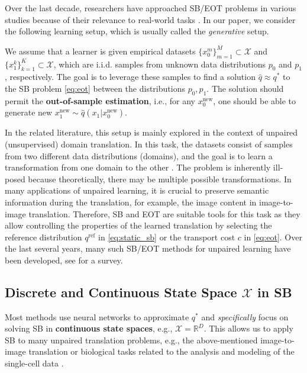 Over the last decade, researchers have approached SB/EOT problems in various studies because of their relevance to real-world tasks \cite{peyre2019computational,gushchin2023building}. In our paper, we consider the following learning setup, which is usually called the \textit{generative} setup.

We assume that a learner is given empirical datasets $\{x^m_0\}_{m=1}^M \subset \mathcal{X}$ and $\{x^k_1\}_{k=1}^K \subset \mathcal{X}$, which are i.i.d. samples from unknown data distributions $p_0$ and $p_1$, respectively. The goal is to leverage these samples to find a solution $\widehat{q}\approx q^{*}$ to the SB problem \eqref{eq:eot} between the distributions $p_0, p_1$. The solution should permit the \textbf{out-of-sample estimation}, i.e., for any $x_{0}^{\text{new}}$, one should be able to generate new $x_{1}^{\text{new}}\sim \widehat{q}(x_1|x_{0}^{\text{new}})$.

In the related literature, this setup is mainly explored in the context of unpaired (unsupervised) domain translation. In this task, the datasets consist of samples from two different data distributions (domains), and the goal is to learn a transformation from one domain to the other \citep[Figure 2]{zhu2017unpaired}. The problem is inherently ill-posed because theoretically, there may be multiple possible transformations. In many applications of unpaired learning, it is crucial to preserve semantic information during the translation, for example, the image content in image-to-image translation. Therefore, SB and EOT are suitable tools for this task as they allow controlling the properties of the learned translation by selecting the reference distribution $q^{\text{ref}}$ in \eqref{eq:static_sb} or the transport cost $c$ in \eqref{eq:eot}. Over the last several years, many such SB/EOT methods for unpaired learning have been developed, see \citep{gushchin2023building} for a survey.

\subsection{Discrete and Continuous State Space $\mathcal{X}$ in SB}
\label{sec:bg-space}

Most methods \cite{mokrov2023energy,de2021diffusion,vargas2021solving,gushchin2023entropic,gushchin2024adversarial,korotin2024light,gushchin2024light,shi2023diffusion,liu2022deep,chen2022likelihood} use neural networks to approximate $q^{*}$ and \textit{specifically} focus on solving SB in \textbf{continuous state spaces}, e.g., ${\mathcal{X}=\mathbb{R}^{D}}$. This allows us to apply SB to many unpaired translation problems, e.g., the above-mentioned image-to-image translation or biological tasks related to the analysis and modeling of the single-cell data \cite{pariset2023unbalanced,tong2024simulation}.

